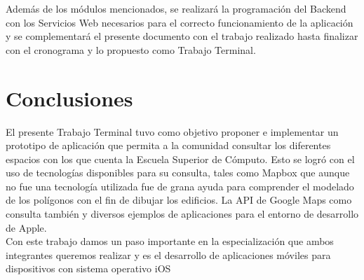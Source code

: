 Además de los módulos mencionados, se realizará la programación del Backend con los Servicios Web necesarios para el correcto funcionamiento de la aplicación y se complementará el presente documento con el trabajo realizado hasta finalizar con el cronograma y lo propuesto como Trabajo Terminal.

\section{Conclusiones}

El presente Trabajo Terminal tuvo como objetivo proponer e implementar un prototipo de aplicación que permita a la comunidad consultar los diferentes espacios con los que cuenta la Escuela Superior de Cómputo. Esto se logró con el uso de tecnologías disponibles para su consulta, tales como Mapbox que aunque no fue una tecnología utilizada fue de grana ayuda para comprender el modelado de los polígonos con el fin de dibujar los edificios. La API de Google Maps como consulta también y diversos ejemplos de aplicaciones para el entorno de desarrollo de Apple.\\

Con este trabajo damos un paso importante en la especialización que ambos integrantes queremos realizar y es el desarrollo de aplicaciones móviles para dispositivos con sistema operativo iOS 